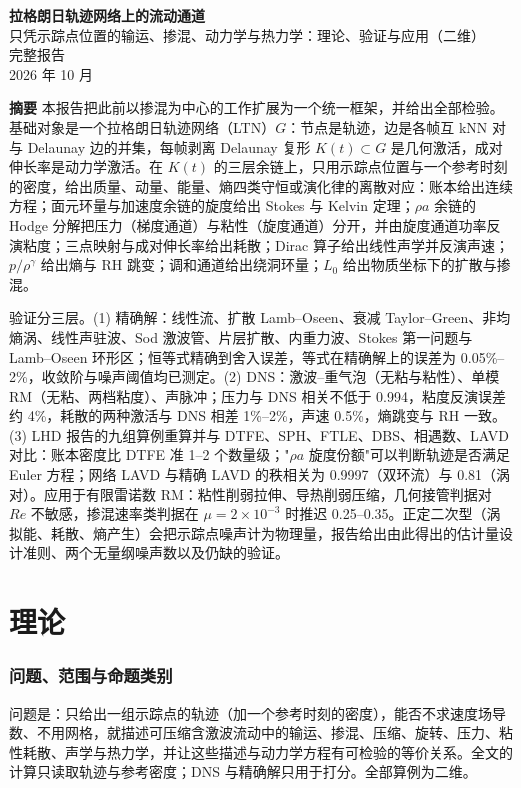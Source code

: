 \documentclass[11pt,a4paper]{article}
\begin{document}
\begin{center}
{\sffamily\LARGE\bfseries 拉格朗日轨迹网络上的流动通道}\\[5pt]
{\sffamily\large 只凭示踪点位置的输运、掺混、动力学与热力学：理论、验证与应用（二维）}\\[4pt]
{\sffamily 完整报告}\\[8pt]
{\small 2026 年 10 月}
\end{center}

\noindent\textbf{摘要}\quad
本报告把此前以掺混为中心的工作扩展为一个统一框架，并给出全部检验。基础对象是一个拉格朗日轨迹网络（LTN）$G$：节点是轨迹，边是各帧互 kNN 对与 Delaunay 边的并集，每帧剥离 Delaunay 复形 $K(t)\subset G$ 是几何激活，成对伸长率是动力学激活。在 $K(t)$ 的三层余链上，只用示踪点位置与一个参考时刻的密度，给出质量、动量、能量、熵四类守恒或演化律的离散对应：账本给出连续方程；面元环量与加速度余链的旋度给出 Stokes 与 Kelvin 定理；$\rho a$ 余链的 Hodge 分解把压力（梯度通道）与粘性（旋度通道）分开，并由旋度通道功率反演粘度；三点映射与成对伸长率给出耗散；Dirac 算子给出线性声学并反演声速；$p/\rho^\gamma$ 给出熵与 RH 跳变；调和通道给出绕洞环量；$L_0$ 给出物质坐标下的扩散与掺混。

验证分三层。(1) 精确解：线性流、扩散 Lamb–Oseen、衰减 Taylor–Green、非均熵涡、线性声驻波、Sod 激波管、片层扩散、内重力波、Stokes 第一问题与 Lamb–Oseen 环形区；恒等式精确到舍入误差，等式在精确解上的误差为 0.05\%–2\%，收敛阶与噪声阈值均已测定。(2) DNS：激波–重气泡（无粘与粘性）、单模 RM（无粘、两档粘度）、声脉冲；压力与 DNS 相关不低于 0.994，粘度反演误差约 4\%，耗散的两种激活与 DNS 相差 1\%–2\%，声速 0.5\%，熵跳变与 RH 一致。(3) LHD 报告的九组算例重算并与 DTFE、SPH、FTLE、DBS、相遇数、LAVD 对比：账本密度比 DTFE 准 1–2 个数量级；"$\rho a$ 旋度份额"可以判断轨迹是否满足 Euler 方程；网络 LAVD 与精确 LAVD 的秩相关为 0.9997（双环流）与 0.81（涡对）。应用于有限雷诺数 RM：粘性削弱拉伸、导热削弱压缩，几何接管判据对 $Re$ 不敏感，掺混速率类判据在 $\mu=2\times10^{-3}$ 时推迟 0.25–0.35。正定二次型（涡拟能、耗散、熵产生）会把示踪点噪声计为物理量，报告给出由此得出的估计量设计准则、两个无量纲噪声数以及仍缺的验证。

\tableofcontents
\newpage

\part{理论}
\section{问题、范围与命题类别}
问题是：只给出一组示踪点的轨迹（加一个参考时刻的密度），能否不求速度场导数、不用网格，就描述可压缩含激波流动中的输运、掺混、压缩、旋转、压力、粘性耗散、声学与热力学，并让这些描述与动力学方程有可检验的等价关系。全文的计算只读取轨迹与参考密度；DNS 与精确解只用于打分。全部算例为二维。
\end{document}
